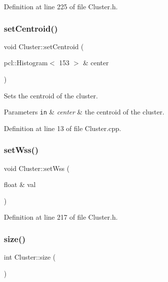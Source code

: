Definition at line 225 of file Cluster.\+h.

\mbox{\label{class_cluster_a9af018a96861327b211e6fe5c7290f52}} 
\subsubsection{\texorpdfstring{set\+Centroid()}{setCentroid()}}
{\footnotesize\ttfamily void Cluster\+::set\+Centroid (\begin{DoxyParamCaption}\item[{pcl\+::\+Histogram$<$ 153 $>$ \&}]{center }\end{DoxyParamCaption})}

Sets the centroid of the cluster. 
\begin{DoxyParams}[1]{Parameters}
\mbox{\tt in}  & {\em center} & the centroid of the cluster. \\
\hline
\end{DoxyParams}


Definition at line 13 of file Cluster.\+cpp.

\mbox{\label{class_cluster_a400d6e1f3b7e206bec4821dcf5aef3ec}} 
\subsubsection{\texorpdfstring{set\+Wss()}{setWss()}}
{\footnotesize\ttfamily void Cluster\+::set\+Wss (\begin{DoxyParamCaption}\item[{float \&}]{val }\end{DoxyParamCaption})\hspace{0.3cm}{\ttfamily [inline]}}



Definition at line 217 of file Cluster.\+h.

\mbox{\label{class_cluster_a3de9ef447e04c6691a5010d3b0b7916b}} 
\subsubsection{\texorpdfstring{size()}{size()}}
{\footnotesize\ttfamily int Cluster\+::size (\begin{DoxyParamCaption}{ }\end{DoxyParamCaption})\hspace{0.3cm}{\ttfamily [inline]}}



